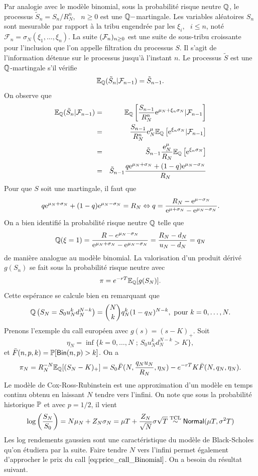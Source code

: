 Par analogie avec le modèle binomial, sous la probabilité risque neutre $\mathbb{Q}$, le processus $\tilde{S}_n = S_n/R_N^n,\text{ }n\geq0$ est une $\mathbb{Q}-$martingale. Les variables aléatoires $S_n$ sont mesurable par rapport à la tribu engendrée par les $\xi_i,\text{ }i\leq n$, noté $\mathcal{F}_n = \sigma_N(\xi_1,\ldots, \xi_n)$. La suite $(\mathcal{F}_n)_{n\geq0}$ est une suite de sous-tribu croissante pour l'inclusion que l'on appelle filtration du processus $S$. Il s'agit de l'information détenue sur le processus jusqu'à l'instant $n$. Le processus $\tilde S$ est une $\mathbb{Q}$-martingale s'il vérifie 
$$
\mathbb{E}_{\mathbb{Q}}(\tilde{S}_n|\mathcal{F}_{n-1}) =  \tilde S_{n-1}.
$$
On observe que 
\begin{eqnarray*}
\mathbb{E}_{\mathbb{Q}}(\tilde{S}_n|\mathcal{F}_{n-1})& =& \mathbb{E}_{\mathbb{Q}}\left[\frac{S_{n-1}}{R_N^n}\mathrm{e}^{\mu_N + \xi_{n}\sigma_N}|\mathcal{F}_{n-1}\right]\\
& =& \frac{S_{n-1}}{R_N^n}\mathrm{e}^\mu_N\mathbb{E}_{\mathbb{Q}}\left[\mathrm{e}^{\xi_{n}\sigma_N}|\mathcal{F}_{n-1}\right]\\
& =& \tilde S_{n-1}\frac{\mathrm{e}^\mu_N}{R_N}\mathbb{E}_{\mathbb{Q}}\left[\mathrm{e}^{\xi_{n}\sigma_N}\right]\\
& =& \tilde S_{n-1}\frac{q\mathrm{e}^{\mu_N+\sigma_N}+ (1-q)\mathrm{e}^{\mu_N-\sigma_N} }{R_N}\\
\end{eqnarray*}
Pour que $S$ soit une martingale, il faut que 
$$
q\mathrm{e}^{\mu_N+\sigma_N}+ (1-q)\mathrm{e}^{\mu_N-\sigma_N} = R_N \Leftrightarrow q = \frac{R_N-\mathrm{e}^{\mu-\sigma_N}}{\mathrm{e}^{\mu+\sigma_N}-\mathrm{e}^{\mu_N-\sigma_N}}.
$$
On a bien identifié la probabilité risque neutre $\mathbb{Q}$ telle que 
$$
\mathbb{Q}(\xi = 1) = \frac{R-e^{\mu_N-\sigma_N}}{\mathrm{e}^{\mu_N+\sigma_N}-\mathrm{e}^{\mu_N-\sigma_N}}=\frac{R_N-d_N}{u_N-d_N}=q_N
$$
de manière analogue au modèle binomial. La valorisation d'un produit dérivé $g(S_n)$ se fait sous la probabilité risque neutre avec 
$$
\pi = e^{-rT}\mathbb{E}_{\mathbb{Q}}[g(S_N)].
$$ 
Cette espérance se calcule bien en remarquant que 
$$
\mathbb{Q}\left(S_N = S_0u_N^kd_N^{N-k}\right) = \binom{N}{k}q_N^k(1-q_N)^{N-k},\text{ pour }k = 0,\ldots, N.
$$
Prenons l'exemple du call européen avec $g(s) = (s-K)_+$. Soit 
\begin{equation}\label{eq:eta}
\eta_N =\inf\{k = 0,\ldots, N\text{ ; }S_0u_N^kd_N^{N-k}>K\},
\end{equation}
et $\bar{F}(n,p,k) = \mathbb{P}[\mathsf{Bin}(n,p)> k]
$. On a 
\begin{equation}\label{eq:price_call_Binomial}
\pi_N = R_N^{-N}\mathbb{E}_{\mathbb{Q}}[(S_N-K)_+] = S_0\bar{F}(N,\frac{q_Nu_N}{R_N},\eta_N)- e^{-rT}K \bar{F}(N,q_N,\eta_N).
\end{equation}
Le modèle de Cox-Ross-Rubinstein est une approximation d'un modèle en temps continu obtenu en laissant $N$ tendre vers l'infini. On note que sous la probabilité historique $\mathbb{P}$ et avec $p=1/2$, il vient
$$
\log\left(\frac{S_N}{S_0}\right) = N\mu_N+Z_N\sigma_N = \mu T + \frac{Z_N}{\sqrt{N}}\sigma\sqrt{T}\overset{\text{TCL}}{\sim}\mathsf{Normal}(\mu T, \sigma^2T)
$$
Les log rendements gaussien sont une caractéristique du modèle de Black-Scholes qu'on étudiera par la suite. Faire tendre $N$ vers l'infini permet également d'approcher le prix du call $\eqref{eq:price_call_Binomial}$. On a besoin du résultat suivant. 

